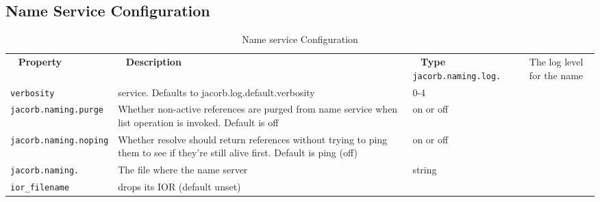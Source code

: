 \subsection{Name Service Configuration}
\begin{small}
\begin{longtable}{|p{5cm}|p{9cm}|p{2cm}|}
\caption{Name service Configuration}\\
\hline
~ \hfill \textbf {Property} \hfill ~ & ~ \hfill \textbf {Description} \hfill ~ & ~ \hfill \textbf {Type} \hfill ~ \endhead
\hline
\verb"jacorb.naming.log." & The log level for the name & \\
\verb"verbosity" & service. Defaults to jacorb.log.default.verbosity & 0-4  \\
\hline
\verb"jacorb.naming.purge" & Whether non-active references are purged from name service
when list operation is invoked. Default is off & on or off \\
\hline
\verb"jacorb.naming.noping" & Whether resolve should return references without trying to
ping them to see if they're still alive first. Default is ping (off) &
on or off\\
\hline
\verb"jacorb.naming." & The file where the name server & string\\
\verb"ior_filename" &  drops its IOR (default unset) &   \\
\hline
\end{longtable}
\end{small}



